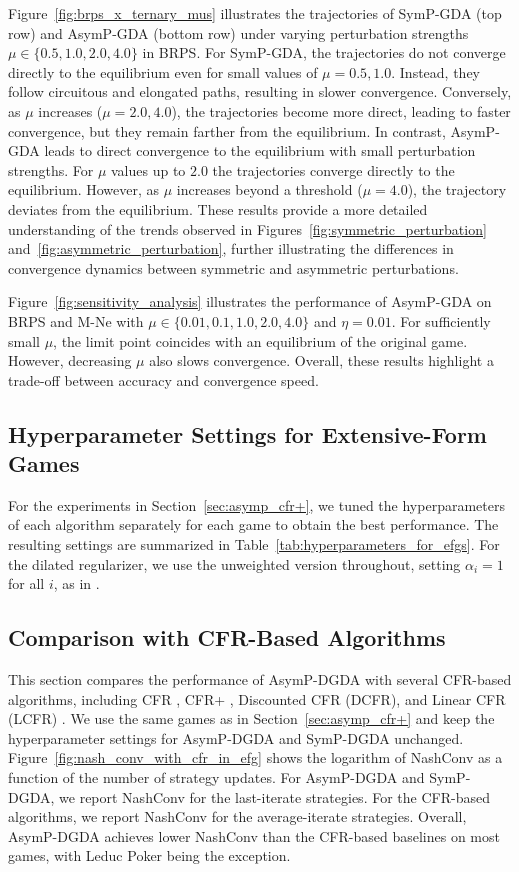\documentclass{article}
\theoremstyle{plain}
\begin{document}
Figure~\ref{fig:brps_x_ternary_mus} illustrates the trajectories of SymP-GDA (top row) and AsymP-GDA (bottom row) under varying perturbation strengths $\mu\in \{0.5, 1.0, 2.0, 4.0\}$ in BRPS.
For SymP-GDA, the trajectories do not converge directly to the equilibrium even for small values of $\mu = 0.5, 1.0$.
Instead, they follow circuitous and elongated paths, resulting in slower convergence.
Conversely, as $\mu$ increases ($\mu = 2.0, 4.0$), the trajectories become more direct, leading to faster convergence, but they remain farther from the equilibrium.
In contrast, AsymP-GDA leads to direct convergence to the equilibrium with small perturbation strengths.
For $\mu$ values up to $2.0$ the trajectories converge directly to the equilibrium.
However, as $\mu$ increases beyond a threshold ($\mu =
    4.0$), the trajectory deviates from the equilibrium.
These results provide a more detailed understanding of the trends observed in Figures~\ref{fig:symmetric_perturbation} and~\ref{fig:asymmetric_perturbation}, further illustrating the differences in convergence dynamics between symmetric and asymmetric perturbations.

Figure~\ref{fig:sensitivity_analysis} illustrates the performance of AsymP-GDA on BRPS and M-Ne with $\mu\in\{0.01,0.1,1.0,2.0,4.0\}$ and $\eta=0.01$.
For sufficiently small $\mu$, the limit point coincides with an equilibrium of the original game.
However, decreasing $\mu$ also slows convergence.
Overall, these results highlight a trade-off between accuracy and convergence speed.


\subsection{Hyperparameter Settings for Extensive-Form Games}
For the experiments in Section~\ref{sec:asymp_cfr+}, we tuned the hyperparameters of each algorithm separately for each game to obtain the best performance.
The resulting settings are summarized in Table~\ref{tab:hyperparameters_for_efgs}.
For the dilated regularizer, we use the unweighted version throughout, setting $\alpha_i=1$ for all $i$, as in \citet{lee2021last}.


\subsection{Comparison with CFR-Based Algorithms}
This section compares the performance of AsymP-DGDA with several CFR-based algorithms, including CFR \citep{zinkevich2007regret}, CFR+ \citep{tammelin2014solving}, Discounted CFR (DCFR), and Linear CFR (LCFR) \citep{brown2019solving}.
We use the same games as in Section~\ref{sec:asymp_cfr+} and keep the hyperparameter settings for AsymP-DGDA and SymP-DGDA unchanged.
Figure~\ref{fig:nash_conv_with_cfr_in_efg} shows the logarithm of NashConv as a function of the number of strategy updates.
For AsymP-DGDA and SymP-DGDA, we report NashConv for the last-iterate strategies.
For the CFR-based algorithms, we report NashConv for the average-iterate strategies.
Overall, AsymP-DGDA achieves lower NashConv than the CFR-based baselines on most games, with Leduc Poker being the exception.
\end{document}

